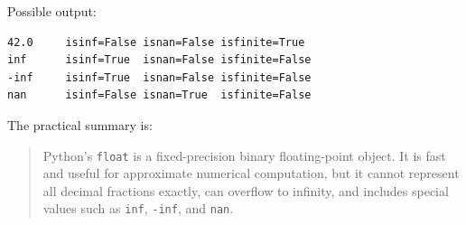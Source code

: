 Possible output:

\begin{verbatim}
42.0     isinf=False isnan=False isfinite=True 
inf      isinf=True  isnan=False isfinite=False
-inf     isinf=True  isnan=False isfinite=False
nan      isinf=False isnan=True  isfinite=False
\end{verbatim}

The practical summary is:

\begin{quote}
Python's \texttt{float} is a fixed-precision binary floating-point object. It is fast and useful for approximate numerical computation, but it cannot represent all decimal fractions exactly, can overflow to infinity, and includes special values such as \texttt{inf}, \texttt{-inf}, and \texttt{nan}.
\end{quote}